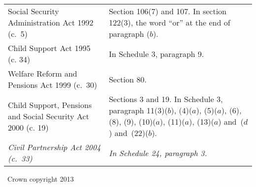 \documentclass[12pt,a4paper]{article}
\begin{document}
\begin{longtable}{p{137.53691pt}p{228.4536pt}}
Social Security Administration Act 1992 (c.\ 5) & Section 106(7) and 107.\newline
In section 122(3), the word “or” at the end of paragraph ($b$). \\
Child Support Act 1995 (c. 34)	&In Schedule 3, paragraph 9.\\
Welfare Reform and Pensions Act 1999 (c.\ 30)	&Section 80.\\
Child Support, Pensions and Social Security Act 2000 (c. 19) & Sections 3 and 19.\newline
In Schedule 3, paragraph 11(3)($b$), (4)($a$), (5)($a$), (6), (8), (9), (10)($a$), (11)($a$), (13)($a$) and~($d$) and~(22)($b$).\\
\emph{Civil Partnership Act 2004 (c.\ 33)}&\emph{In Schedule 24, paragraph 3.}\\
\end{longtable}


\begin{center}
\textcopyright\ Crown copyright 2013
\end{center}
\end{document}
